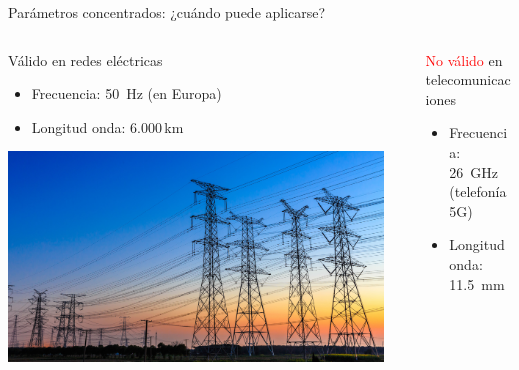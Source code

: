 \documentclass[aspectratio=169, xcolor={usenames,svgnames,dvipsnames}]{beamer}
\begin{document}
\begin{frame}{Parámetros concentrados: \hspace{5mm} ¿cuándo puede aplicarse?}
    \vspace{-1mm}
    \begin{columns}[T]
    \begin{column}{0.4\columnwidth}
        \alert{Válido} en redes eléctricas
        \begin{itemize}
            \item \alert{Frecuencia}: \SI{50}{\hertz} (en Europa)
            \item \alert{Longitud onda}: $6.000$\,\si{\kilo\meter}
        \end{itemize}    
        \begin{center}
            \includegraphics[height=0.35\textheight]{../figs/red_electrica.jpg} 
        \end{center}        
    \end{column}  
    \vrule
    \begin{column}{0.01\columnwidth}
    \end{column}     
    \begin{column}{0.49\columnwidth}
        \alert{\textcolor{red}{No válido}} en telecomunicaciones
        \begin{itemize}
            \item \alert{Frecuencia}: \SI{26}{\giga\hertz} (telefonía 5G)
            \item \alert{Longitud onda}: \SI{11.5}{\milli\meter}
        \end{itemize}

\end{column}
\end{columns}
\end{frame}
\end{document}
